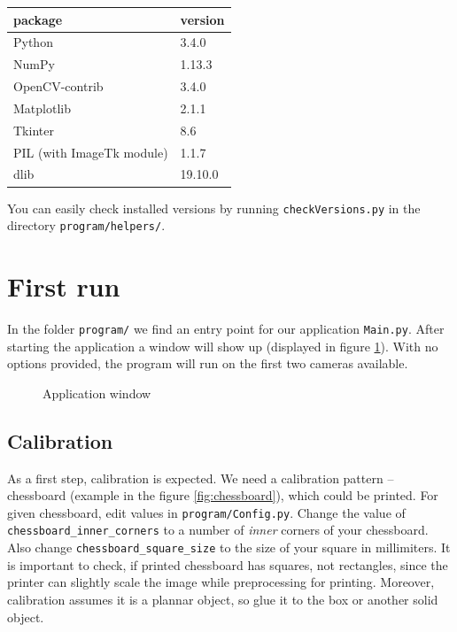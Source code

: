 \begin{center}
\begin{tabular}{l l}
	package	&	version 	\\ \hline
	Python	&	3.4.0 		\\
	NumPy	&	1.13.3 		\\
	OpenCV-contrib	&	3.4.0 	\\ 
	Matplotlib &	2.1.1 		\\
	Tkinter	&	8.6 		\\
	PIL (with ImageTk module)	&	1.1.7 		\\
	dlib	&	19.10.0
\end{tabular}
\end{center}

You can easily check installed versions by running \verb+checkVersions.py+ in
the directory \verb+program/helpers/+.

\section{First run}

In the folder \verb+program/+ we find an entry point for our application
\verb+Main.py+. After starting the application a window will show up (displayed
in figure \ref{fig:application}). With no options provided, the program will
run on the first two cameras available.

\begin{figure}
	\caption{Application window}
	\label{fig:application}
\end{figure}

\subsection{Calibration}
As a first step, calibration is expected. We need a calibration pattern --
chessboard (example in the figure \ref{fig:chessboard}), which could be
printed. For given chessboard, edit values in \verb+program/Config.py+. Change
the value of \verb+chessboard_inner_corners+ to a number of \emph{inner}
corners of your chessboard. Also change \verb+chessboard_square_size+ to the
size of your square in millimiters. It is important to check, if printed
chessboard has squares, not rectangles, since the printer can slightly scale
the image while preprocessing for printing. Moreover, calibration assumes it is
a plannar object, so glue it to the box or another solid object.

